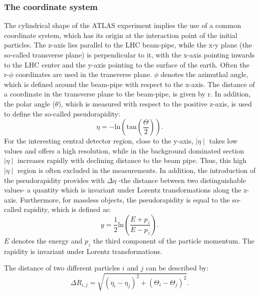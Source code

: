 \subsubsection{The coordinate system }\label{Coordinate}
The cylindrical shape of the ATLAS experiment implies the use of a common coordinate system, which has its origin at the interaction point of the initial particles. 
The z-axis lies parallel to the LHC beam-pipe, while the  x-y plane (the so-called transverse plane)  is perpendicular to it, with the x-axis pointing inwards to the LHC center and the y-axis pointing to the surface of the earth.  Often the r-$\phi$ coordinates are used in the transverse plane.
 $\phi$ denotes the azimuthal angle, which is defined  around the beam-pipe with respect to the x-axis.
 The distance of a coordinate in the transverse plane to the beam-pipe, is given by r.  
 In addition, the polar angle ($\theta$), which is measured  with respect to the positive z-axis, is used to define the so-called pseudorapidity:
\begin{equation}\label{pseudorapidity}\eta = -\text{ln}\left(\text{tan}\left(\frac{\Theta}{2}\right)\right).
\end{equation}  
 For the interesting central detector region, close to the y-axis, $\mid\eta\mid$ takes low values and offers a high resolution, while in the background dominated section $\mid\eta\mid$ increases rapidly with declining distance to the beam pipe. Thus, this high $\mid\eta\mid$  region is often excluded in the measurements. In addition, the introduction of the pseudorapidity provides with $\Delta \eta$ -the distance between two distinguishable values- a quantity which is invariant under Lorentz transformations along the z-axis. Furthermore, for massless objects, the pseudorapidity is equal to the so-called rapidity, which is defined as:
\begin{equation}\label{rapidity}
y = \frac{1}{2}\text{ln}\left(\frac{E + p_z}{E - p_z}\right).
\end{equation}
$E$ denotes the energy and $p_z$ the third component of the particle momentum. The rapidity is invariant under Lorentz transformations. 


The distance of two different particles $i$ and $j$ can be described by:
\begin{equation}\label{dinstance}
\Delta R_{i,j} = \sqrt{(\eta_i-\eta_j)^2+(\Theta_i-\Theta_j)^2}.
\end{equation}
   

